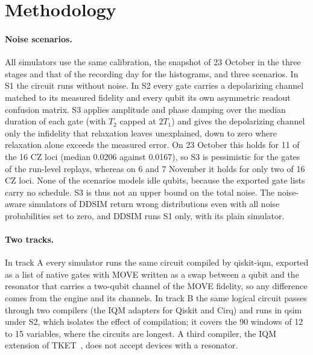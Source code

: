\documentclass{scspaperproc}
\begin{document}
\section{Methodology}
\label{sec:method}

\paragraph{Noise scenarios.}
All simulators use the same calibration, the snapshot of 23 October in the
three stages and that of the recording day for the histograms, and three
scenarios. In S1
the circuit runs without noise. In S2 every gate carries a depolarizing
channel matched to its measured fidelity and every qubit its own asymmetric
readout confusion matrix. S3 applies amplitude and phase damping over the
median duration of each gate (with $T_2$ capped at $2T_1$) and gives the depolarizing channel only the infidelity
that relaxation leaves unexplained, down to zero where relaxation alone
exceeds the measured error. On 23 October this holds for 11 of the 16 CZ
loci (median 0.0206 against 0.0167), so S3 is pessimistic for the gates of the
run-level replays, whereas on 6 and 7 November it holds for only two of 16 CZ
loci. None of the scenarios models idle qubits, because the exported gate lists
carry no schedule. S3 is thus not an upper bound on the total noise. The
noise-aware simulators of DDSIM return wrong distributions even with all
noise probabilities set to zero, and DDSIM runs S1 only, with its plain
simulator.

\paragraph{Two tracks.}
In track A every simulator runs the same circuit compiled by qiskit-iqm,
exported as a list of native gates with MOVE written as a swap between a qubit
and the resonator that carries a two-qubit channel of the MOVE fidelity, so
any difference comes from the engine and its channels. In track B the same
logical circuit passes through two compilers (the IQM adapters for Qiskit and
Cirq) and runs in qsim under S2, which isolates the effect of compilation; it
covers the 90 windows of 12 to 15 variables, where the circuits are longest. A
third compiler, the IQM extension of TKET~\cite{sivarajah2020tket}, does not
accept devices with a resonator.
\end{document}
